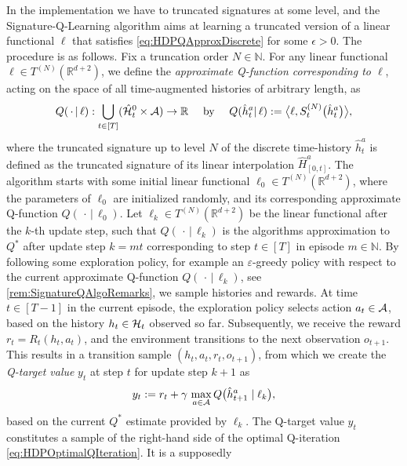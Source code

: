 \documentclass[
    a4paper,
    11pt,
    bibliography=totoc,
    listof=totoc,      
    headinclude=true,
    cleardoublepage=empty,
]{scrbook}
\theoremstyle{plain}
\theoremstyle{definition}
\theoremstyle{remark}
\newcommand{\SetR}{\mathbb R}
\newcommand{\SetN}{\mathbb N}
\newcommand{\SpaceA}{{\cal A}}
\newcommand{\SpaceH}{{\cal H}}
\begin{document}
In the implementation we have to truncated signatures at 
some level, and the Signature-Q-Learning algorithm aims at learning a 
truncated version of a linear functional $\ell$ that satisfies \eqref{eq:HDPQApproxDiscrete} for some $\epsilon>0$. The 
procedure is as follows. Fix a truncation order $N\in\SetN$. For any linear 
functional $\ell\in T^{(N)}(\SetR^{d+2})$, we define the \textit{approximate 
Q-function corresponding to $\ell$}, acting on the space of all time-augmented 
histories of arbitrary length, as
\begin{equation}
    Q(\,\cdot\,|\,\ell): 
        \bigcup_{t\in[T]} (\hat\SpaceH^0_t\times\SpaceA) \to \SetR 
    \quad \text{ by } \quad
    Q(\hat h^a_t|\,\ell) := \bigl\langle     
        \ell, S^{(N)}_t\bigl(\hat{h}^a_t\bigr) 
    \bigr\rangle,    
\end{equation}
where the truncated signature up to level $N$ of the discrete time-history 
$\hat h^a_t$ is defined as the truncated signature of its linear interpolation 
$\hat H^a_{[0,t]}$. The algorithm starts with some initial 
linear functional $\ell_0 \in T^{(N)}(\SetR^{d+2})$, where the parameters of 
$\ell_0$ are initialized randomly, and its corresponding approximate 
Q-function $Q(\,\cdot\,|\,\ell_0)$. Let $\ell_k \in T^{(N)}(\SetR^{d+2})$ be 
the linear functional after the $k$-th update step, such that $Q(\,\cdot\,|\,\ell_k)$ is the algorithms 
approximation to $Q^*$ after update step $k=m t$ corresponding to step 
$t\in[T]$ in episode $m\in\SetN$. By following some exploration policy, for 
example an $\varepsilon$-greedy policy with respect to the current approximate 
Q-function $Q(\,\cdot\,|\,\ell_k)$, see \cref{rem:SignatureQAlgoRemarks}, we 
sample histories and rewards. At time $t\in[T-1]$ in the current episode, the 
exploration policy selects action $a_t\in\SpaceA$, based on the 
history $h_t\in\SpaceH_t$ observed so far. Subsequently, we receive the reward 
$r_t = R_t(h_t,a_t)$, and the environment transitions to the next observation 
$o_{t+1}$. This results in a transition sample 
$(h_t,a_t,r_t,o_{t+1})$, from which we create the \textit{Q-target value} $y_t$ at 
step $t$ for update step $k+1$ as
\begin{equation}
\label{eq:HDPQTargetValue}
    y_t := r_t + \gamma\, \max_{a\in\SpaceA} 
        Q\bigl( \hat{h}^a_{t+1}\mid\ell_k \bigr),
\end{equation}
based on the current $Q^*$ estimate provided by $\ell_k$. The Q-target value $y_t$ constitutes a sample of the right-hand side of the
optimal Q-iteration \eqref{eq:HDPOptimalQIteration}. It is a supposedly 
\end{document}
